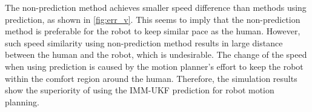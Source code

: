 \documentclass[letterpaper, 10 pt, conference]{ieeeconf}
\begin{document}
	
	The non-prediction method achieves smaller speed difference than methods using prediction, as shown in \cref{fig:err_v}.
	This seems to imply that the non-prediction method is preferable for the robot to keep similar pace as the human.
	However, such speed similarity using non-prediction method results in large distance between the human and the robot, which is undesirable.
	The change of the speed when using prediction is caused by the motion planner's effort to keep the robot within the comfort region around the human.
	Therefore, the simulation results show the superiority of using the IMM-UKF prediction for robot motion planning.
	
\end{document}

